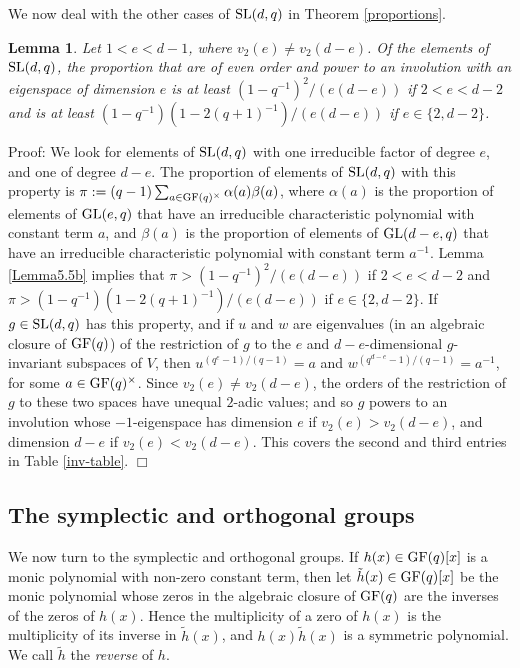 \documentclass[12pt]{article}
\newtheorem{lemma}[definition]{Lemma}
\newenvironment{proof}{\normalsize {\sc Proof}:}{{\hfill $\Box$ \\}}
\def\SL{{\rm SL}}
\def\GL{{\rm GL}}
\def\GF{{\rm GF}}
\begin{document}
We now deal with the other cases of $\SL(d,q)$ in Theorem \ref{proportions}.
\begin{lemma}
Let $1<e<d - 1$, where $v_2(e)\ne v_2(d-e)$.  Of the elements of $\SL(d,q)$, 
the proportion that are of even order and power to an involution
with an eigenspace of dimension $e$ is at least  
$(1-q^{-1})^2/(e(d - e))$ if $2 < e < d - 2$
and is at least $(1 - q^{-1}) (1 - 2(q + 1)^{-1}) / (e(d - e))$
if $e \in \{2, d - 2\}$.
\end{lemma}
\begin{proof}
We look for elements of $\SL(d,q)$ with one irreducible factor of 
degree $e$, and one of degree $d-e$.  The proportion
of elements of $\SL(d,q)$ with this property is 
$\pi := (q-1)\sum_{a\in\GF(q)^\times}\alpha(a)\beta(a)$, 
where $\alpha(a)$ is the proportion of elements of $\GL(e,q)$ that have
an irreducible characteristic polynomial with constant term $a$, and 
$\beta(a)$ is the proportion of elements of $\GL(d-e,q)$
that have an irreducible characteristic polynomial with 
constant term $a^{-1}$.  Lemma \ref{Lemma5.5b} implies that 
$\pi > (1-q^{-1})^2/(e(d - e))$ if $2 < e < d - 2$
and  $\pi > (1 - q^{-1}) (1 - 2(q + 1)^{-1}) / (e(d - e))$
if $e \in \{2, d - 2\}$.
If $g\in\SL(d,q)$ has this property, and if $u$ and $w$ are eigenvalues 
(in an algebraic closure of $\GF(q)$) of the restriction 
of $g$ to the $e$ and $d-e$-dimensional $g$-invariant subspaces of $V$, then 
$u^{(q^e-1)/(q-1)}=a$ and $w^{(q^{d-e}-1)/(q-1)}=a^{-1}$,
for some $a\in\GF(q)^\times$.  Since $v_2(e)\ne v_2(d-e)$, 
the orders of the restriction of $g$ to these two spaces have
unequal $2$-adic values; and so $g$ powers to an involution whose 
$-1$-eigenspace has dimension $e$ if $v_2(e)>v_2(d-e)$, and 
dimension $d-e$ if $v_2(e)<v_2(d-e)$. 
This covers the second and third entries in Table \ref{inv-table}.
\end{proof}

\subsection{The symplectic and orthogonal groups}
We now turn to the symplectic and orthogonal groups.
If $h(x)\in\GF(q)[x]$ is a
monic polynomial with non-zero constant term, then let
$\tilde{h}(x)\in\GF(q)[x]$ be the monic polynomial whose zeros in the
algebraic closure of $\GF(q)$ are the
inverses of the zeros of $h(x)$. Hence the multiplicity of a zero of
$h(x)$ is the multiplicity of its inverse in $\tilde{h}(x)$, and 
$h(x)\tilde{h}(x)$ is a symmetric  polynomial. 
We call $\tilde{h}$ the \emph{reverse} of $h$.
\end{document}

